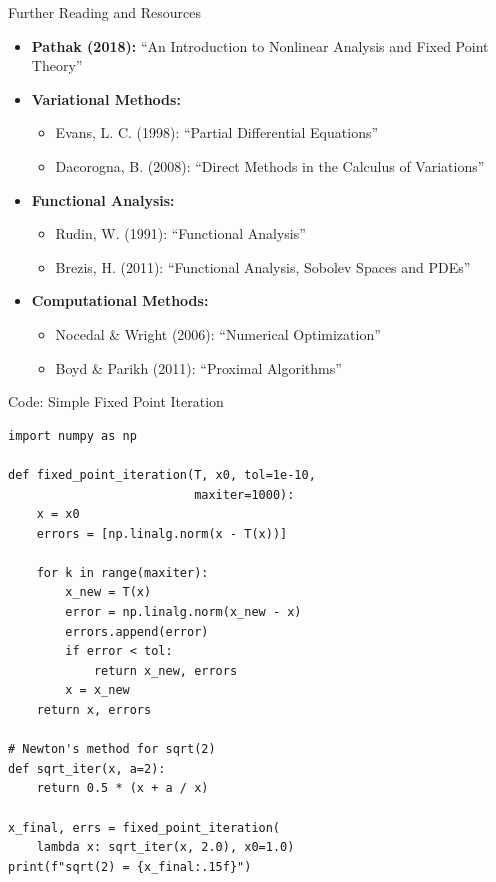 \documentclass[aspectratio=169,10pt]{beamer}
\begin{document}
\begin{frame}{Further Reading and Resources}
  \begin{itemize}
    \item \textbf{Pathak (2018):} ``An Introduction to Nonlinear Analysis and Fixed Point Theory''

    \item \textbf{Variational Methods:}
    \begin{itemize}
      \item Evans, L. C. (1998): ``Partial Differential Equations''
      \item Dacorogna, B. (2008): ``Direct Methods in the Calculus of Variations''
    \end{itemize}

    \item \textbf{Functional Analysis:}
    \begin{itemize}
      \item Rudin, W. (1991): ``Functional Analysis''
      \item Brezis, H. (2011): ``Functional Analysis, Sobolev Spaces and PDEs''
    \end{itemize}

    \item \textbf{Computational Methods:}
    \begin{itemize}
      \item Nocedal \& Wright (2006): ``Numerical Optimization''
      \item Boyd \& Parikh (2011): ``Proximal Algorithms''
    \end{itemize}
  \end{itemize}
\end{frame}

\begin{frame}[fragile]{Code: Simple Fixed Point Iteration}
  \begin{lstlisting}
import numpy as np

def fixed_point_iteration(T, x0, tol=1e-10,
                          maxiter=1000):
    x = x0
    errors = [np.linalg.norm(x - T(x))]

    for k in range(maxiter):
        x_new = T(x)
        error = np.linalg.norm(x_new - x)
        errors.append(error)
        if error < tol:
            return x_new, errors
        x = x_new
    return x, errors

# Newton's method for sqrt(2)
def sqrt_iter(x, a=2):
    return 0.5 * (x + a / x)

x_final, errs = fixed_point_iteration(
    lambda x: sqrt_iter(x, 2.0), x0=1.0)
print(f"sqrt(2) = {x_final:.15f}")
  \end{lstlisting}
\end{frame}
\end{document}
